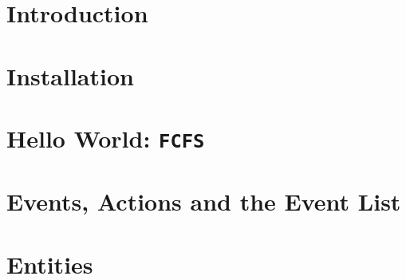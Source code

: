 \documentclass[12pt]{book}
\begin{document}
\chapter{Introduction}
\label{chap:intro}


\chapter{Installation}
\label{chap:install}


\chapter{Hello World: \texttt{\bf FCFS}}
\label{chap:hello-world}


\chapter{Events, Actions and the Event List}
\label{chap:events-actions-event-list}


\chapter{Entities}
\label{chap:entities}


%

%

%

%

%
\end{document}
